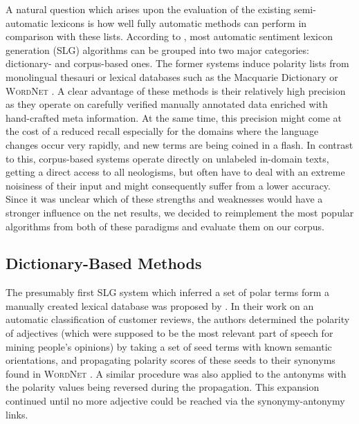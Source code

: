A natural question which arises upon the evaluation of the existing
semi-automatic lexicons is how well fully automatic methods can
perform in comparison with these lists.  According to
\citet[p. 79]{Liu:12}, most automatic sentiment lexicon generation
(SLG) algorithms can be grouped into two major categories: dictionary-
and corpus-based ones.  The former systems induce polarity lists from
monolingual thesauri or lexical databases such as the Macquarie
Dictionary \cite{Bernard:86} or \textsc{WordNet} \cite{Miller:95}.  A
clear advantage of these methods is their relatively high precision as
they operate on carefully verified manually annotated data enriched
with hand-crafted meta information.  At the same time, this precision
might come at the cost of a reduced recall especially for the domains
where the language changes occur very rapidly, and new terms are being
coined in a flash.  In contrast to this, corpus-based systems operate
directly on unlabeled in-domain texts, getting a direct access to all
neologisms, but often have to deal with an extreme noisiness of their
input and might consequently suffer from a lower accuracy.  Since it
was unclear which of these strengths and weaknesses would have a
stronger influence on the net results, we decided to reimplement the
most popular algorithms from both of these paradigms and evaluate them
on our corpus.

\subsection{Dictionary-Based Methods}

The presumably first SLG system which inferred a set of polar terms
form a manually created lexical database was proposed by
\citet{Hu:04}.  In their work on an automatic classification of
customer reviews, the authors determined the polarity of adjectives
(which were supposed to be the most relevant part of speech for mining
people's opinions) by taking a set of seed terms with known semantic
orientations, and propagating polarity scores of these seeds to their
synonyms found in \textsc{WordNet} \cite{Miller:95}.  A similar
procedure was also applied to the antonyms with the polarity values
being reversed during the propagation.  This expansion continued until
no more adjective could be reached via the synonymy-antonymy links.

